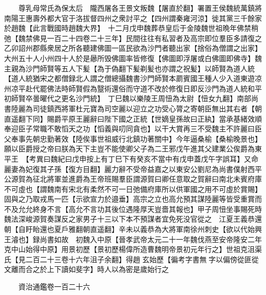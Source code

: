 　　尊乳母常氏為保太后　隴西屠各王景文叛魏【屠直於翻】署置王侯魏統萬鎮將南陽王惠壽外都大官于洛拔督四州之衆討平之【四州謂秦雍河涼】徙其黨三千餘家於趙魏【此言戰國時趙魏大界】　十二月戊申魏葬恭皇后于金陵魏世祖晩年佛禁稍弛【魏禁佛見一百二十四卷二十三年】民間往往有私習者及高宗即位羣臣多請復之乙卯詔州郡縣衆居之所各聽建佛圖一區民欲為沙門者聽出家【捨俗為僧謂之出家】大州五十人小州四十人於是曏所毁佛圖率皆修復【佛圖即浮屠或白佛圖即佛寺】魏主親為沙門師賢等五人下髪【為于偽翻下髪剃髪也亦謂之祝髪】以師賢為道人統【道人統猶宋之都僧録北人謂之僧總攝魏書沙門師賢本罽賓國王種人少入道東遊凉州凉平赴代罷佛法時師賢假為毉術還俗而守道不改於修復日即反沙門為道人統和平初師賢卒曇曜代之更名沙門統】　丁巳魏以樂陵王周忸為太尉【忸女九翻】南部尚書陸麗為司徒鎮西將軍杜元寶為司空麗以迎立之功受心膂之寄朝臣無出其右者【朝直遥翻下同】賜爵平原王麗辭曰陛下國之正統【世嫡皇孫故曰正紈】當承基緒效順奉迎臣子常職不敢慆天之功【慆義與叨同貪也】以干大賞再三不受魏主不許麗曰臣父奉事先朝忠勤著效【陸俟事世祖威行北鎮功著關中】今年逼桑榆【桑榆晚景也】願以臣爵授之帝曰朕為天下主豈不能使卿父子為二王邪戊午進其父建業公俟爵為東平王　【考異曰魏紀曰戊申按上有丁巳下有癸亥不當中有戊申蓋戊午字誤耳】又命麗妻為妃復其子孫【復方目翻】麗力辭不受帝益嘉之以東安公劉尼為尚書僕射西平公源賀為征北將軍並進爵為王帝班賜羣臣謂源賀曰卿任意取之賀辭曰南北未賓府庫不可虛也【謂魏南有宋北有柔然不可一日弛備府庫所以供軍國之用不可虛於賞賜】固與之乃取戎馬一匹【示欲宣力於邉垂】高宗之立也高允預其謀陸麗等皆受重賞而不及允允終身不言【高允不言功其後位遇隆厚天豈嗇其報也】甲子周忸坐事賜死時魏法深峻源賀奏謀反之家男子十三以下本不預謀者宜免死没官從之　江夏王義恭還朝【自盱眙還也夏戶雅翻朝直遥翻】辛未以義恭為大將軍南徐州刺史【欲以代始興王濬也】録尚書如故　初魏入中原【晉孝武帝太元二十一年魏伐燕至安帝隆安二年克中山始得中原】用景初歷【景初歷楊偉所造曹魏明帝景初元年行之】世祖克沮渠氏【見二百二十三卷十六年沮子余翻】得趙玄始歷【徧考字書無字以偏傍從匪從文離而合之於上下讀如斐字】時人以為密是歲始行之

　　資治通鑑卷一百二十六  
    


 


 



 

 
  







 


　　
　　
　
　
　


　　

